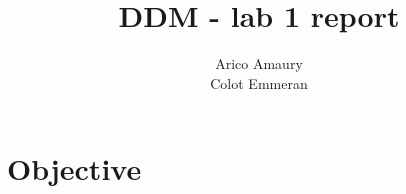 \documentclass[10pt,twocolumn]{article}
\title{DDM - lab 1 report}
\author{Arico Amaury\\Colot Emmeran}
\date{}
\begin{document}
\maketitle

\section{Objective}
\end{document}
